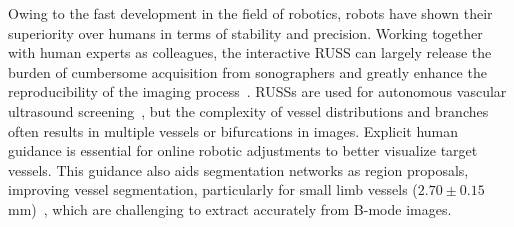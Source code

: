\par
Owing to the fast development in the field of robotics, robots have shown their superiority over humans in terms of stability and precision.
Working together with human experts as colleagues, the interactive RUSS can largely release the burden of cumbersome acquisition from sonographers and greatly enhance the reproducibility of the imaging process~\cite{li2021overview,von2021medical,huang2023review}.
RUSSs are used for autonomous vascular ultrasound screening~\cite{jiang2021autonomous,huangQ2024robot}, but the complexity of vessel distributions and branches often results in multiple vessels or bifurcations in images. Explicit human guidance is essential for online robotic adjustments to better visualize target vessels. This guidance also aids segmentation networks as region proposals, improving vessel segmentation, particularly for small limb vessels ($2.70\pm0.15$ mm)~\cite{wahood2022radial}, which are challenging to extract accurately from B-mode images.

